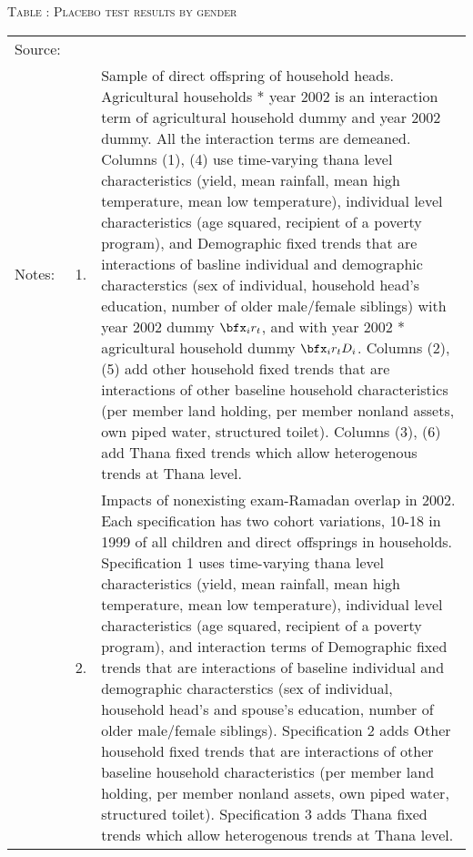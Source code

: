 \begin{table}
\hfil\textsc{\footnotesize Table \thetable: Placebo test results by gender\label{PlaceboResults10Table}}\\
\setlength{\tabcolsep}{1pt}
\renewcommand{\arraystretch}{.55}
\hfil

\renewcommand{\arraystretch}{1}
\hfil\begin{tabular}{>{\hfill\scriptsize}p{1cm}<{}>{\hfill\scriptsize}p{.5cm}<{}>{\scriptsize}p{12cm}<{\hfill}}
Source:& \multicolumn{2}{l}{\scriptsize Compiled from IFPRI data. }\\[-1ex]
Notes:& 1. & Sample of direct offspring of household heads. \textsf{Agricultural households * year 2002} is an interaction term of agricultural household dummy and year 2002 dummy. All the interaction terms are demeaned. Columns \textsf{(1), (4)} use time-varying thana level characteristics (yield, mean rainfall, mean high temperature, mean low temperature), individual level characteristics (age squared, recipient of a poverty program), and \textsf{Demographic fixed trends} that are interactions of basline individual and demographic characterstics (sex of individual, household head's education, number of older male/female siblings) with year 2002 dummy $\bfx_{i}r_{t}$, and with year 2002 * agricultural household dummy $\bfx_{i}r_{t}D_{i}$. Columns \textsf{(2), (5)} add \textsf{other household fixed trends} that are interactions of other baseline household characteristics (per member land holding, per member nonland assets, own piped water, structured toilet). Columns \textsf{(3), (6)} add \textsf{Thana fixed trends} which allow heterogenous trends at Thana level. \\[-1ex]
& 2. & Impacts of nonexisting exam-Ramadan overlap in 2002. Each specification has two cohort variations, \textsf{10-18 in 1999} of all children and direct offsprings in households. \textsf{Specification 1} uses time-varying thana level characteristics (yield, mean rainfall, mean high temperature, mean low temperature), individual level characteristics (age squared, recipient of a poverty program), and interaction terms of \textsf{Demographic fixed trends} that are interactions of baseline individual and demographic characterstics (sex of individual, household head's and spouse's education, number of older male/female siblings). \textsf{Specification 2} adds \textsf{Other household fixed trends} that are interactions of other baseline household characteristics (per member land holding, per member nonland assets, own piped water, structured toilet). \textsf{Specification 3} adds \textsf{Thana fixed trends} which allow heterogenous trends at Thana level. \\[-1ex]

\end{tabular}
\end{table}
